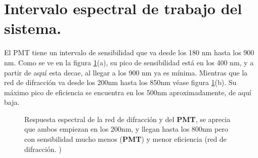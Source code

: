\section{Intervalo espectral de trabajo del sistema. }
El PMT tiene un intervalo de sensibilidad que va desde los 180 nm hasta los 900 nm. Como se ve en la figura \ref{fig:respuesta}(a), su pico de sensibilidad está en los 400 nm, y a partir de aquí esta decae, al llegar a los 900 nm ya es mínima. Mientras que la red de difracción va desde los 200nm hasta los 850nm véase figura \ref{fig:respuesta}(b). Su máximo pico de eficiencia se encuentra en los 500nm aproximadamente, de aquí baja.
\begin{figure}[h]
	\centering
	\caption{Respuesta espectral de la red de difracción y del \textbf{PMT}, se aprecia que ambos empiezan en los 200nm, y llegan hasta los 800nm pero con sensibilidad mucho menos (\textbf{PMT}) \cite{H8249} y menor eficiencia (red de difracción. \cite{reddifrac})  }
	\label{fig:respuesta}
\end{figure}

